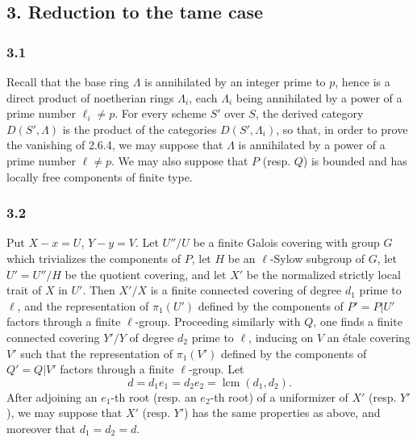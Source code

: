 \documentclass[11pt]{article}
\begin{document}
\subsection*{3. Reduction to the tame case}

\subsubsection*{3.1}
Recall that the base ring $\Lambda$ is annihilated by an integer prime to $p$, hence is a direct product of noetherian rings $\Lambda_i$, each $\Lambda_i$ being annihilated by a power of a prime number $\ell_i\ne p$. For every scheme $S'$ over $S$, the derived category $D(S',\Lambda)$ is the product of the categories $D(S',\Lambda_i)$, so that, in order to prove the vanishing of 2.6.4, we may suppose that $\Lambda$ is annihilated by a power of a prime number $\ell\ne p$. We may also suppose that $P$ (resp. $Q$) is bounded and has locally free components of finite type.

\subsubsection*{3.2}
Put $X-x=U$, $Y-y=V$. Let $U''/U$ be a finite Galois covering with group $G$ which trivializes the components of $P$, let $H$ be an $\ell$-Sylow subgroup of $G$, let $U'=U''/H$ be the quotient covering, and let $X'$ be the normalized strictly local trait of $X$ in $U'$. Then $X'/X$ is a finite connected covering of degree $d_1$ prime to $\ell$, and the representation of $\pi_1(U')$ defined by the components of $P'=P|U'$ factors through a finite $\ell$-group. Proceeding similarly with $Q$, one finds a finite connected covering $Y'/Y$ of degree $d_2$ prime to $\ell$, inducing on $V$ an étale covering $V'$ such that the representation of $\pi_1(V')$ defined by the components of $Q'=Q|V'$ factors through a finite $\ell$-group. Let
\[
d=d_1e_1=d_2e_2=\operatorname{lcm}(d_1,d_2).
\]
After adjoining an $e_1$-th root (resp. an $e_2$-th root) of a uniformizer of $X'$ (resp. $Y'$), we may suppose that $X'$ (resp. $Y'$) has the same properties as above, and moreover that $d_1=d_2=d$.
\end{document}
